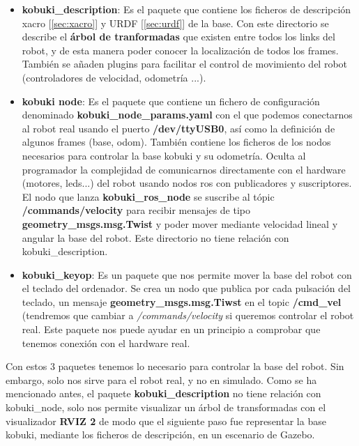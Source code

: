 \begin{itemize}
	\item \textbf{kobuki\_description}: Es el paquete que contiene los ficheros de descripción xacro [\ref{sec:xacro}] y URDF [\ref{sec:urdf}] de la base. Con este directorio se describe el \textbf{árbol de tranformadas} que existen entre todos los links del robot, y de esta manera poder conocer la localización de todos los frames. También se añaden plugins para facilitar el control de movimiento del robot (controladores de velocidad, odometría ...).
	\item \textbf{kobuki node}: Es el paquete que contiene un fichero de configuración denominado \textbf{kobuki\_node\_params.yaml} con el que podemos conectarnos al robot real usando el puerto \textbf{/dev/ttyUSB0}, así como la definición de algunos frames (base, odom). También contiene los ficheros de los nodos necesarios para controlar la base kobuki y su odometría. Oculta al programador la complejidad de comunicarnos directamente con el hardware (motores, leds...) del robot usando nodos ros con publicadores y suscriptores. El nodo que lanza \textbf{kobuki\_ros\_node} se suscribe al tópic \textbf{/commands/velocity} para recibir mensajes de tipo \textbf{geometry\_msgs.msg.Twist} y poder mover mediante velocidad lineal y angular la base del robot. Este directorio no tiene relación con kobuki\_description.
	\item \textbf{kobuki\_keyop}: Es un paquete que nos permite mover la base del robot con el teclado del ordenador. Se crea un nodo que publica por cada pulsación del teclado, un mensaje \textbf{geometry\_msgs.msg.Tiwst} en el topic \textbf{/cmd\_vel} (tendremos que cambiar a \textit{/commands/velocity} si queremos controlar el robot real. Este paquete nos puede ayudar en un principio a comprobar que tenemos conexión con el hardware real.
\end{itemize}

Con estos 3 paquetes tenemos lo necesario para controlar la base del robot. Sin embargo, solo nos sirve para el robot real, y no en simulado. Como se ha mencionado antes, el paquete \textbf{kobuki\_description} no tiene relación con kobuki\_node, solo nos permite visualizar un árbol de transformadas con el visualizador \textbf{RVIZ 2} de modo que el siguiente paso fue representar la base kobuki, mediante los ficheros de descripción, en un escenario de Gazebo.\\




